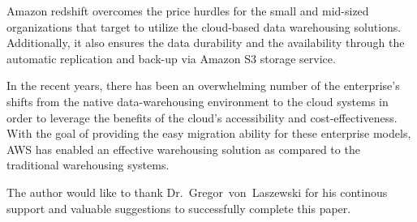     	Amazon redshift overcomes the price hurdles for the small and mid-sized 
	organizations that target to utilize the cloud-based data warehousing 
	solutions. Additionally, it also ensures the data durability and the 
	availability through the automatic replication and back-up via 
	Amazon S3 storage service. 
    
    	In the recent years, there has been an overwhelming number of the 
	enterprise's shifts from the native data-warehousing environment 
	to the cloud systems in order to leverage the benefits of the 
	cloud's accessibility and cost-effectiveness. With the goal 
	of providing the easy migration ability for these enterprise 
	models, AWS has enabled an effective warehousing solution as 
	compared to the traditional warehousing systems.  
	
\begin{acks}

  The author would like to thank Dr.~Gregor~von~Laszewski for his continous
  support and valuable suggestions to successfully complete this paper.
  
\end{acks}


 
